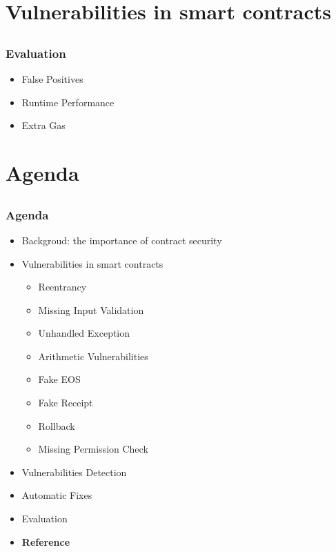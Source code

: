 \documentclass[notheorems, aspectratio=54]{beamer}
\begin{document}

\section{Vulnerabilities in smart contracts}
\subsection{}
\begin{frame}
    \frametitle{Evaluation}

    \begin{itemize}
        \item False Positives
        \item Runtime Performance
        \item Extra Gas
    \end{itemize}
    
\end{frame}


\section{Agenda}
\subsection{}
\begin{frame}
    \frametitle{Agenda}

    \begin{itemize}
        \item Backgroud: the importance of contract security
        \item Vulnerabilities in smart contracts
        \begin{itemize}
            \item Reentrancy
            \item Missing Input Validation
            \item Unhandled Exception
            \item Arithmetic Vulnerabilities
            \item Fake EOS
            \item Fake Receipt
            \item Rollback
            \item Missing Permission Check
        \end{itemize}
        \item Vulnerabilities Detection
        \item Automatic Fixes
        \item Evaluation
        \item \textbf{Reference}
    \end{itemize}
    
\end{frame}
\end{document}
